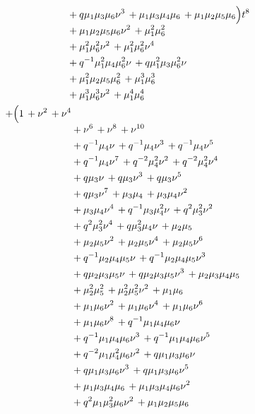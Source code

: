 \documentclass[10pt]{article}
\begin{document}
\[\begin{aligned}
\begin{aligned}[t]
  &{}+q\mu_1\mu_3\mu_6\nu^{3}\,+\mu_1\mu_3\mu_4\mu_6\,+\mu_1\mu_2\mu_5\mu_6 \\
  &{}+\mu_1\mu_2\mu_5\mu_6\nu^{2}\,+\mu_1^{2}\mu_6^{2} \\
  &{}+\mu_1^{2}\mu_6^{2}\nu^{2}\,+\mu_1^{2}\mu_6^{2}\nu^{4} \\
  &{}+q^{-1}\mu_1^{2}\mu_4\mu_6^{2}\nu\,+q\mu_1^{2}\mu_3\mu_6^{2}\nu \\
  &{}+\mu_1^{2}\mu_2\mu_5\mu_6^{2}\,+\mu_1^{3}\mu_6^{3} \\
  &{}+\mu_1^{3}\mu_6^{3}\nu^{2}\,+\mu_1^{4}\mu_6^{4}\end{aligned}\Bigr)t^{8} \\
  + \Bigl(\begin{aligned}[t]1\,+\nu^{2}\,+\nu^{4} \\
  &{}+\nu^{6}\,+\nu^{8}\,+\nu^{10} \\
  &{}+q^{-1}\mu_4\nu\,+q^{-1}\mu_4\nu^{3}\,+q^{-1}\mu_4\nu^{5} \\
  &{}+q^{-1}\mu_4\nu^{7}\,+q^{-2}\mu_4^{2}\nu^{2}\,+q^{-2}\mu_4^{2}\nu^{4} \\
  &{}+q\mu_3\nu\,+q\mu_3\nu^{3}\,+q\mu_3\nu^{5} \\
  &{}+q\mu_3\nu^{7}\,+\mu_3\mu_4\,+\mu_3\mu_4\nu^{2} \\
  &{}+\mu_3\mu_4\nu^{4}\,+q^{-1}\mu_3\mu_4^{2}\nu\,+q^{2}\mu_3^{2}\nu^{2} \\
  &{}+q^{2}\mu_3^{2}\nu^{4}\,+q\mu_3^{2}\mu_4\nu\,+\mu_2\mu_5 \\
  &{}+\mu_2\mu_5\nu^{2}\,+\mu_2\mu_5\nu^{4}\,+\mu_2\mu_5\nu^{6} \\
  &{}+q^{-1}\mu_2\mu_4\mu_5\nu\,+q^{-1}\mu_2\mu_4\mu_5\nu^{3} \\
  &{}+q\mu_2\mu_3\mu_5\nu\,+q\mu_2\mu_3\mu_5\nu^{3}\,+\mu_2\mu_3\mu_4\mu_5 \\
  &{}+\mu_2^{2}\mu_5^{2}\,+\mu_2^{2}\mu_5^{2}\nu^{2}\,+\mu_1\mu_6 \\
  &{}+\mu_1\mu_6\nu^{2}\,+\mu_1\mu_6\nu^{4}\,+\mu_1\mu_6\nu^{6} \\
  &{}+\mu_1\mu_6\nu^{8}\,+q^{-1}\mu_1\mu_4\mu_6\nu \\
  &{}+q^{-1}\mu_1\mu_4\mu_6\nu^{3}\,+q^{-1}\mu_1\mu_4\mu_6\nu^{5} \\
  &{}+q^{-2}\mu_1\mu_4^{2}\mu_6\nu^{2}\,+q\mu_1\mu_3\mu_6\nu \\
  &{}+q\mu_1\mu_3\mu_6\nu^{3}\,+q\mu_1\mu_3\mu_6\nu^{5} \\
  &{}+\mu_1\mu_3\mu_4\mu_6\,+\mu_1\mu_3\mu_4\mu_6\nu^{2} \\
  &{}+q^{2}\mu_1\mu_3^{2}\mu_6\nu^{2}\,+\mu_1\mu_2\mu_5\mu_6 \\

\end{aligned}
\end{aligned}\]
\end{document}
